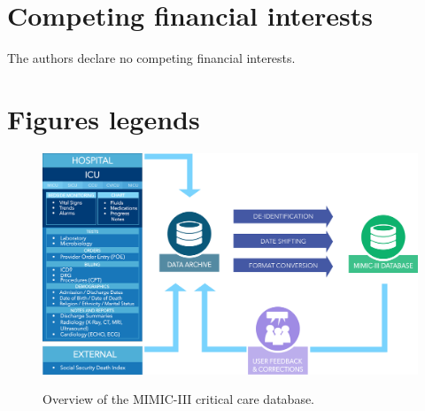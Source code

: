 \documentclass[english]{article}
\begin{document}
\section*{Competing financial interests}

The authors declare no competing financial interests.

\section*{Figures legends}



\begin{center}
\begin{figure}
\caption{Overview of the MIMIC-III critical care database.}
\includegraphics[width=\textwidth]{mimic.png}
\label{fig:mimicoverview}
\end{figure}
\end{center}
\end{document}
